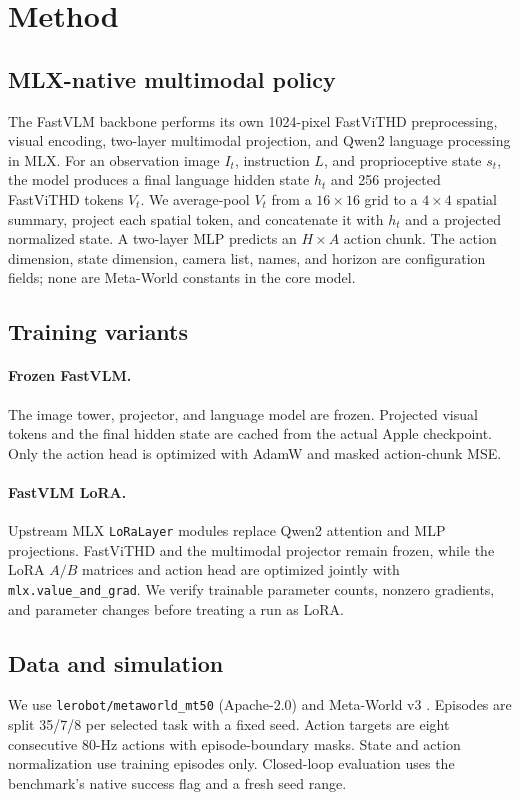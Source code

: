 \documentclass[10pt,letterpaper]{article}
\begin{document}
\section{Method}
\subsection{MLX-native multimodal policy}
The FastVLM backbone performs its own 1024-pixel FastViTHD preprocessing, visual encoding,
two-layer multimodal projection, and Qwen2 language processing in MLX. For an observation image
$I_t$, instruction $L$, and proprioceptive state $s_t$, the model produces a final language hidden
state $h_t$ and 256 projected FastViTHD tokens $V_t$. We average-pool $V_t$ from a $16\times16$
grid to a $4\times4$ spatial summary, project each spatial token, and concatenate it with $h_t$
and a projected normalized state. A two-layer MLP predicts an $H\times A$ action chunk.
The action dimension, state dimension, camera list, names, and horizon are configuration fields;
none are Meta-World constants in the core model.

\subsection{Training variants}
\paragraph{Frozen FastVLM.} The image tower, projector, and language model are frozen. Projected
visual tokens and the final hidden state are cached from the actual Apple checkpoint. Only the
action head is optimized with AdamW and masked action-chunk MSE.

\paragraph{FastVLM LoRA.} Upstream MLX \texttt{LoRaLayer} modules replace Qwen2 attention and MLP
projections. FastViTHD and the multimodal projector remain frozen, while the LoRA $A/B$ matrices
and action head are optimized jointly with \texttt{mlx.value\_and\_grad}. We verify trainable
parameter counts, nonzero gradients, and parameter changes before treating a run as LoRA.

\subsection{Data and simulation}
We use \texttt{lerobot/metaworld\_mt50} (Apache-2.0) and Meta-World v3 \cite{finn2019metaworld}.
Episodes are split 35/7/8 per selected task with a fixed seed. Action targets are eight consecutive
80-Hz actions with episode-boundary masks. State and action normalization use training episodes
only. Closed-loop evaluation uses the benchmark's native success flag and a fresh seed range.
\end{document}
